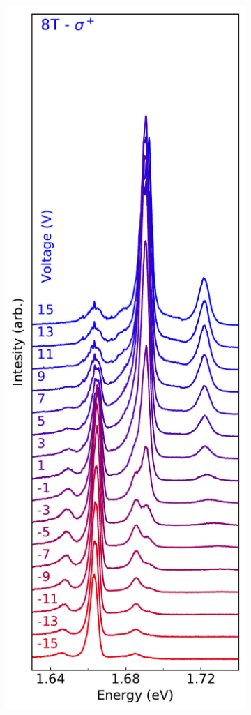 \begin{figure}[h]
\begin{subfigure}{0.32\textwidth}
	\end{subfigure}
	\begin{subfigure}{0.32\textwidth}
		\caption{}
		\includegraphics[width=\textwidth]{waterfall_8T_sp}

\end{subfigure}
\end{figure}
